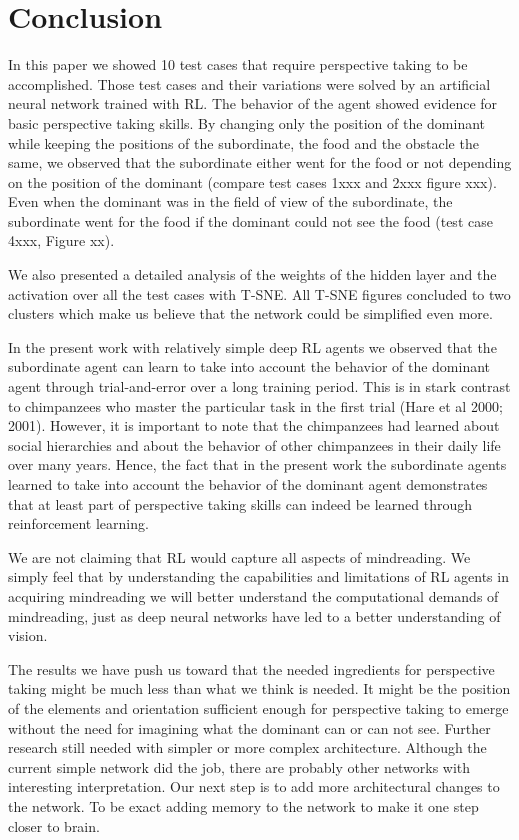 \documentclass{article}
\begin{document}
\section{Conclusion}
In this paper we showed 10 test cases that require perspective taking to be accomplished. Those test cases and their variations were solved by an artificial neural network trained with RL. The behavior of the agent showed evidence for basic perspective taking skills. By changing only the position of the dominant while keeping the positions of the subordinate, the food and the obstacle the same, we observed that the subordinate either went for the food or not depending on the position of the dominant (compare test cases 1xxx and 2xxx figure xxx). Even when the dominant was in the field of view of the subordinate, the subordinate went for the food if the dominant could not see the food (test case 4xxx, Figure xx).  

We also presented a detailed analysis of the weights of the hidden layer and the activation over all the test cases with T-SNE. All T-SNE figures concluded to two clusters which make us believe that the network could be simplified even more. 

In the present work with relatively simple deep RL agents we observed that the subordinate agent can learn to take into account the behavior of the dominant agent through trial-and-error over a long training period. This is in stark contrast to chimpanzees who master the particular task in the first trial  (Hare et al 2000; 2001). However, it is important to note that the chimpanzees had learned about social hierarchies and about the behavior of other chimpanzees in their daily life over many years. Hence, the fact that in the present work the subordinate agents learned to take into account the behavior of the dominant agent demonstrates that at least part of perspective taking skills can indeed be learned through reinforcement learning. 

We are not claiming that RL would capture all aspects of mindreading. We simply feel that by understanding the capabilities and limitations of RL agents in acquiring mindreading we will better understand the computational demands of mindreading, just as deep neural networks have led to a better understanding of vision.


The results we have push us toward that the needed ingredients for perspective taking might be much less than what we think is needed. It might be the position of the elements and orientation sufficient enough for perspective taking to emerge without the need for imagining what the dominant can or can not see. Further research still needed with simpler or more complex architecture. Although the current simple network did the job, there are probably other networks with interesting interpretation. Our next step is to add more architectural changes to the network. To be exact adding memory to the network to make it one step closer to brain.


\appendix
\end{document}
